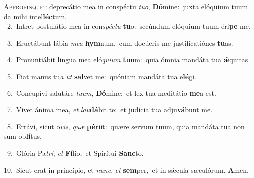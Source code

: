 \lettrine{\initial\textcolor{\initialcolor}{A}}{ppropínquet} deprecátio mea in conspéctu \textit{tu}\-\textit{o}, \textbf{Dó}\-mine:~\star juxta elóquium tuum da mihi intel\-\textbf{léc}\-tum.\\
{\numbfont\textcolor{\numbcolor}{~2.}}~Intret postulátio mea in con\-\textit{spéc}\-\textit{tu} \textbf{tu}\-o:~\star secúndum elóquium tuum éri\textbf{pe} me.\par
{\numbfont\textcolor{\numbcolor}{~3.}}~Eructábunt lábia \textit{me}\-\textit{a} \textbf{hym}\-num,~\star cum docúeris me justificatiónes \textbf{tu}\-as.\par
{\numbfont\textcolor{\numbcolor}{~4.}}~Pronuntiábit lingua mea eló\-\textit{qui}\-\textit{um} \textbf{tu}\-um:~\star quia ómnia mandáta tua \textbf{ǽ}\-quitas.\par
{\numbfont\textcolor{\numbcolor}{~5.}}~Fiat manus tu\textit{a} \textit{ut} \textbf{sal}\-vet me:~\star quóniam mandáta tua e\-\textbf{lé}\-gi.\par
{\numbfont\textcolor{\numbcolor}{~6.}}~Concupívi salutáre \textit{tu}\-\textit{um}, \textbf{Dó}\-mine:~\star et lex tua meditátio \textbf{me}\-a est.\par
{\numbfont\textcolor{\numbcolor}{~7.}}~Vivet ánima mea, \textit{et} \textit{lau}\-\textbf{dá}bit te:~\star et judícia tua adju\-\textbf{vá}\-bunt me.\par
{\numbfont\textcolor{\numbcolor}{~8.}}~Errávi, sicut o\-\textit{vis}\-, \textit{quæ} \textbf{pér}\-iit:~\star quære servum tuum, quia mandáta tua non sum ob\-\textbf{lí}\-tus.\par
{\numbfont\textcolor{\numbcolor}{~9.}}~Glória Pa\-\textit{tri}\-, \textit{et} \textbf{Fí}\-lio,~\star et Spirítui \textbf{Sanc}\-to.\par
{\numbfont\textcolor{\numbcolor}{10.}}~Sicut erat in princípio, et \textit{nunc}\-, \textit{et} \textbf{sem}\-per,~\star et in sǽcula sæculórum. \textbf{A}\-men.\par
